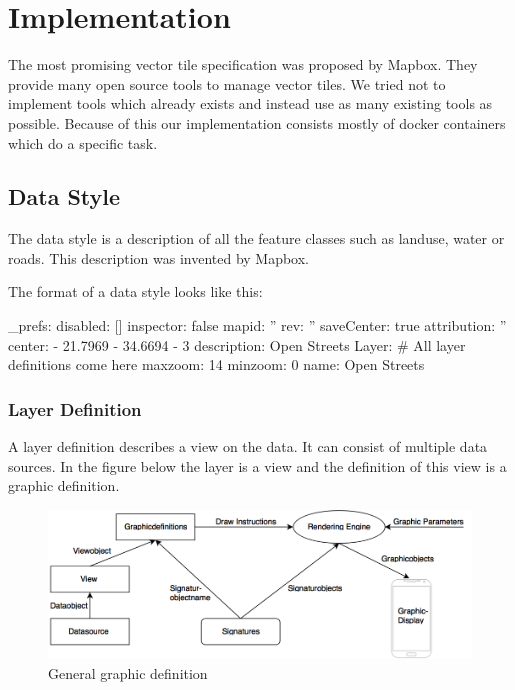 \chapter{Implementation}\label{implementation}

The most promising vector tile specification was proposed by Mapbox.
They provide many open source tools to manage vector tiles. We tried not to implement tools which already exists and instead use as many existing tools as possible. Because of this our implementation consists mostly of docker containers which do a specific task.

\section{Data Style}\label{data_style}

The data style is a description of all the feature classes such as landuse, water or roads. This description was invented by Mapbox.

The format of a data style looks like this:
\begin{yamlcode}
_prefs: 
  disabled: []
  inspector: false
  mapid: ''
  rev: ''
  saveCenter: true
attribution: ''
center: 
  - 21.7969
  - 34.6694
  - 3
description: Open Streets
Layer: 
    # All layer definitions come here
maxzoom: 14
minzoom: 0
name: Open Streets
\end{yamlcode}

\newpage
\subsection{Layer Definition}\label{layer_definition}
A layer definition describes a view on the data. It can consist of multiple data sources. In the figure below the layer is a view and the definition of this view is a graphic definition.

\begin{figure}[h]
  \centering
  \includegraphics[width=1\textwidth]{images/graphic_definition.png}
  \caption{General graphic definition}
\end{figure}

